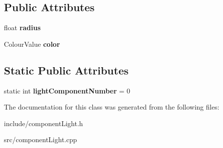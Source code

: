 \subsection*{\-Public \-Attributes}
\begin{DoxyCompactItemize}
\item 
\hypertarget{classComponentTemplateLight_a1e585abfd9f655335df5db444c8a58d7}{
float {\bfseries radius}}
\label{dd/de6/classComponentTemplateLight_a1e585abfd9f655335df5db444c8a58d7}

\item 
\hypertarget{classComponentTemplateLight_ad818a420efee83689d61b54493d534f1}{
\-Colour\-Value {\bfseries color}}
\label{dd/de6/classComponentTemplateLight_ad818a420efee83689d61b54493d534f1}

\end{DoxyCompactItemize}
\subsection*{\-Static \-Public \-Attributes}
\begin{DoxyCompactItemize}
\item 
\hypertarget{classComponentTemplateLight_a1c1a3b8b925d8d02f5126c50c441d389}{
static int {\bfseries light\-Component\-Number} = 0}
\label{dd/de6/classComponentTemplateLight_a1c1a3b8b925d8d02f5126c50c441d389}

\end{DoxyCompactItemize}


\-The documentation for this class was generated from the following files\-:\begin{DoxyCompactItemize}
\item 
include/component\-Light.\-h\item 
src/component\-Light.\-cpp\end{DoxyCompactItemize}
